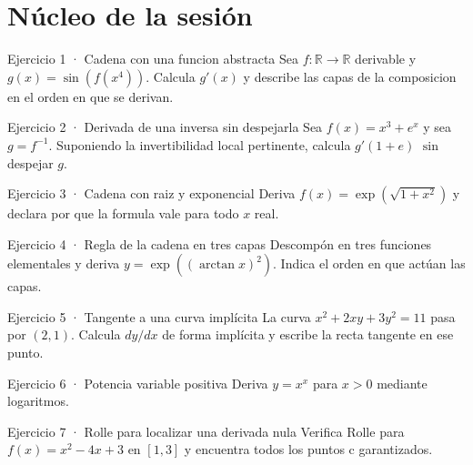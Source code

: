 \documentclass[10pt,a4paper,oneside,openany]{book}
\begin{document}
\section*{Núcleo de la sesión}
\begin{PSevenExerciseFixed}{Ejercicio 1 · Cadena con una funcion abstracta}
Sea \(f:\mathbb{R}\to \mathbb{R}\) derivable y \(g(x)=\sin(f(x^{4}))\). Calcula \(g'(x)\) y describe las capas de la composicion en el orden en que se derivan.
\end{PSevenExerciseFixed}
\begin{PSevenExerciseFixed}{Ejercicio 2 · Derivada de una inversa sin despejarla}
Sea \(f(x)=x^{3}+e^x\) y sea \(g=f^{-1}\). Suponiendo la invertibilidad local pertinente, calcula \(g'(1+e)\) \(\sin\) despejar \(g\).
\end{PSevenExerciseFixed}
\begin{PSevenExerciseFixed}{Ejercicio 3 · Cadena con raiz y exponencial}
Deriva \(f(x)=\exp(\sqrt{1+x^{2}})\) y declara por que la formula vale para todo \(x\) real.
\end{PSevenExerciseFixed}
\begin{PSevenExerciseFixed}{Ejercicio 4 · Regla de la cadena en tres capas}
Descompón en tres funciones elementales y deriva \(y=\exp((\arctan x)^2)\). Indica el orden en que actúan las capas.
\end{PSevenExerciseFixed}
\begin{PSevenExerciseFixed}{Ejercicio 5 · Tangente a una curva implícita}
La curva \(x^2+2xy+3y^2=11\) pasa por \((2,1)\). Calcula \(dy/dx\) de forma implícita y escribe la recta tangente en ese punto.
\end{PSevenExerciseFixed}
\begin{PSevenExerciseFixed}{Ejercicio 6 · Potencia variable positiva}
Deriva \(y=x^x\) para \(x>0\) mediante logaritmos.
\end{PSevenExerciseFixed}
\begin{PSevenExerciseFixed}{Ejercicio 7 · Rolle para localizar una derivada nula}
Verifica Rolle para \(f(x)=x^{2}-4x+3\) en \([1,3]\) y encuentra todos los puntos c garantizados.
\end{PSevenExerciseFixed}
\end{document}
